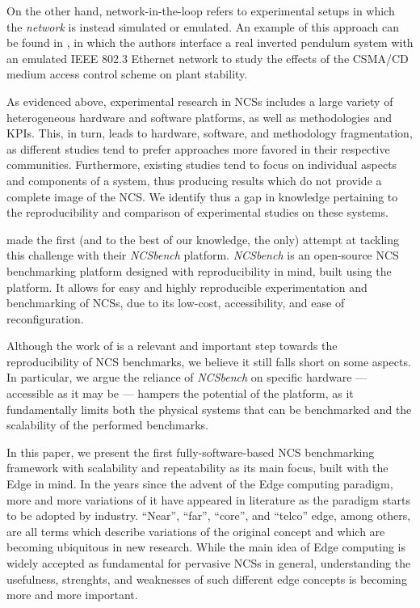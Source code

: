 On the other hand, network-in-the-loop refers to experimental setups in which the \emph{network} is instead simulated or emulated.
An example of this approach can be found in \textcite{Natale2004InvPendEthernet}, in which the authors interface a real inverted pendulum system with an emulated IEEE 802.3 Ethernet network to study the effects of the \ac{CSMA/CD} medium access control scheme on plant stability.

As evidenced above, experimental research in \acp{NCS} includes a large variety of heterogeneous hardware and software platforms, as well as methodologies and \acp{KPI}.
This, in turn, leads to hardware, software, and methodology fragmentation, as different studies tend to prefer approaches more favored in their respective communities.
Furthermore, existing studies tend to focus on individual aspects and components of a system, thus producing results which do not provide a complete image of the \ac{NCS}.
We identify thus a gap in knowledge pertaining to the reproducibility and comparison of experimental studies on these systems.

\textcite{Zoppi2020NCSBench} made the first (and to the best of our knowledge, the only) attempt at tackling this challenge with their \emph{NCSbench} platform.
\emph{NCSbench} is an open-source \ac{NCS} benchmarking platform designed with reproducibility in mind, built using the ~\cite{LEGOMindstormsEV3} platform.
It allows for easy and highly reproducible experimentation and benchmarking of \acp{NCS}, due to its low-cost, accessibility, and ease of reconfiguration.

Although the work of \textcite{Zoppi2020NCSBench} is a relevant and important step towards the reproducibility of \ac{NCS} benchmarks, we believe it still falls short on some aspects.
In particular, we argue the reliance of \emph{NCSbench} on specific hardware --- accessible as it may be --- hampers the potential of the platform, as it fundamentally limits both the physical systems that can be benchmarked and the scalability of the performed benchmarks.

In this paper, we present the first fully-software-based \ac{NCS} benchmarking framework with scalability and repeatability as its main focus, built with the Edge in mind.
In the years since the advent of the Edge computing paradigm, more and more variations of it have appeared in literature as the paradigm starts to be adopted by industry.
``Near'', ``far'', ``core'', and ``telco'' edge, among others, are all terms which describe variations of the original concept and which are becoming ubiquitous in new research.
While the main idea of Edge computing is widely accepted as fundamental for pervasive \acp{NCS} in general, understanding the usefulness, strenghts, and weaknesses of such different edge concepts is becoming more and more important.


